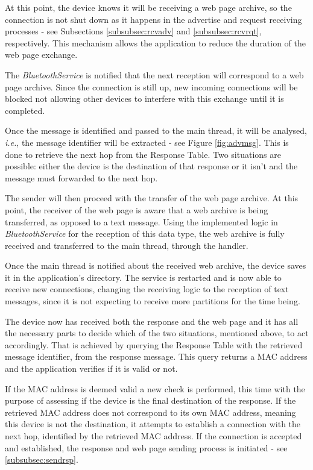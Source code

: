 At this point, the device knows it will be receiving a web page archive, so the connection is not shut down as it happens in the advertise and request receiving processes - see Subsections \ref{subsubsec:rcvadv} and \ref{subsubsec:rcvrqt}, respectively. This mechanism allows the application to reduce the duration of the web page exchange.

The \textit{BluetoothService} is notified that the next reception will correspond to a web page archive. Since the connection is still up, new incoming connections will be blocked not allowing other devices to interfere with this exchange until it is completed.

Once the message is identified and passed to the main thread, it will be analysed, \textit{i.e.}, the message identifier will be extracted - see Figure \ref{fig:advmsg}. This is done to retrieve the next hop from the Response Table. Two situations are possible: either the device is the destination of that response or it isn't and the message must forwarded to the next hop.

The sender will then proceed with the transfer of the web page archive. At this point, the receiver of the web page is aware that a web archive is being transferred, as opposed to a text message. Using the implemented logic in \textit{BluetoothService} for the reception of this data type, the web archive is fully received and transferred to the main thread, through the handler.

Once the main thread is notified about the received web archive, the device saves it in the application's directory. The service is restarted and is now able to receive new connections, changing the receiving logic to the reception of text messages, since it is not expecting to receive more partitions for the time being.

The device now has received both the response and the web page and it has all the necessary parts to decide which of the two situations, mentioned above, to act accordingly. That is achieved by querying the Response Table with the retrieved message identifier, from the response message. This query returns a \gls{MAC} address and the application verifies if it is valid or not.

If the \gls{MAC} address is deemed valid a new check is performed, this time with the purpose of assessing if the device is the final destination of the response. If the retrieved \gls{MAC} address does not correspond to its own \gls{MAC} address, meaning this device is not the destination, it attempts to establish a connection with the next hop, identified by the retrieved \gls{MAC} address. If the connection is accepted and established, the response and web page sending process is initiated - see \ref{subsubsec:sendrsp}.

